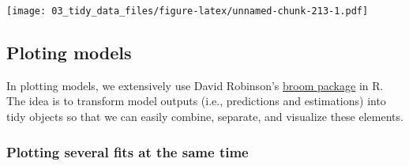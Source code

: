 \documentclass[
]{book}
\begin{document}
\texttt{[image: 03\_tidy\_data\_files/figure-latex/unnamed-chunk-213-1.pdf]}

\hypertarget{ploting-models}{%
\subsection{Ploting models}\label{ploting-models}}

In plotting models, we extensively use David Robinson's \href{https://cran.r-project.org/web/packages/broom/vignettes/broom.html}{broom package} in R. The idea is to transform model outputs (i.e., predictions and estimations) into tidy objects so that we can easily combine, separate, and visualize these elements.

\hypertarget{plotting-several-fits-at-the-same-time}{%
\subsubsection{Plotting several fits at the same time}\label{plotting-several-fits-at-the-same-time}}
\end{document}
